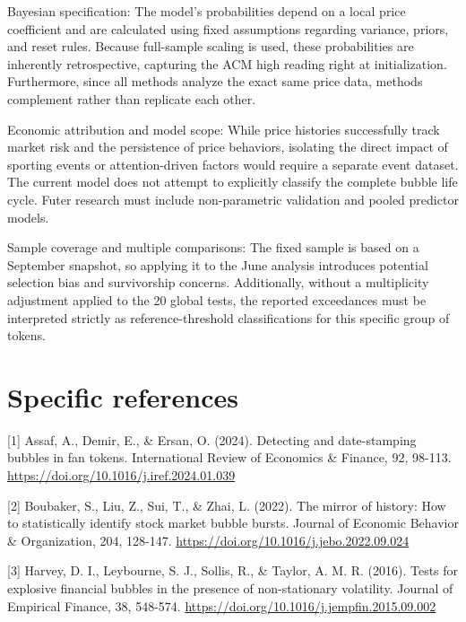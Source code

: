 \documentclass[11pt,a4paper,onecolumn]{article}
\newenvironment{reportreference}{\begingroup\small\setlength{\parskip}{5pt}\leftskip=5mm\parindent=-5mm}{\par\endgroup}
\begin{document}
Bayesian specification: The model's probabilities depend on a local price coefficient and are calculated using fixed assumptions regarding variance, priors, and reset rules. Because full-sample scaling is used, these probabilities are inherently retrospective, capturing the ACM high reading right at initialization. Furthermore, since all methods analyze the exact same price data, methods complement rather than replicate each other.

Economic attribution and model scope: While price histories successfully track market risk and the persistence of price behaviors, isolating the direct impact of sporting events or attention-driven factors would require a separate event dataset. The current model does not attempt to explicitly classify the complete bubble life cycle. Futer research must include non-parametric validation and pooled predictor models.

Sample coverage and multiple comparisons: The fixed sample is based on a September snapshot, so applying it to the June analysis introduces potential selection bias and survivorship concerns. Additionally, without a multiplicity adjustment applied to the 20 global tests, the reported exceedances must be interpreted strictly as reference-threshold classifications for this specific group of tokens.

\clearpage
\section{Specific references}

\begin{reportreference}
[1] Assaf, A., Demir, E., \& Ersan, O. (2024). Detecting and date-stamping bubbles in fan tokens. International Review of Economics \& Finance, 92, 98-113. \url{https://doi.org/10.1016/j.iref.2024.01.039}
\end{reportreference}

\begin{reportreference}
[2] Boubaker, S., Liu, Z., Sui, T., \& Zhai, L. (2022). The mirror of history: How to statistically identify stock market bubble bursts. Journal of Economic Behavior \& Organization, 204, 128-147. \url{https://doi.org/10.1016/j.jebo.2022.09.024}
\end{reportreference}

\begin{reportreference}
[3] Harvey, D. I., Leybourne, S. J., Sollis, R., \& Taylor, A. M. R. (2016). Tests for explosive financial bubbles in the presence of non-stationary volatility. Journal of Empirical Finance, 38, 548-574. \url{https://doi.org/10.1016/j.jempfin.2015.09.002}
\end{reportreference}
\end{document}
